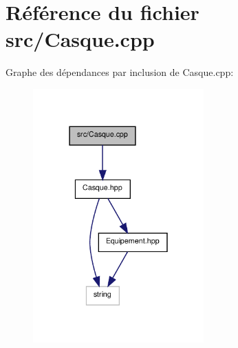 \section{Référence du fichier src/\-Casque.cpp}
\label{_casque_8cpp}
Graphe des dépendances par inclusion de Casque.\-cpp\-:\nopagebreak
\begin{figure}[H]
\begin{center}
\leavevmode
\includegraphics[width=186pt]{_casque_8cpp__incl}
\end{center}
\end{figure}
